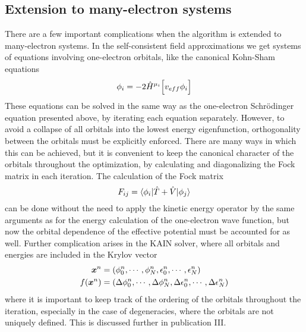 \subsection{Extension to many-electron systems}
There are a few important complications when the algorithm is extended to many-electron systems.
In the self-consistent field approximations we get systems of equations involving one-electron 
orbitals, like the canonical Kohn-Sham equations
\begin{equation}
    \phi_i = -2 \hat{H}^{\mu_i}\Big[v_{eff}\phi_i\Big]
\end{equation}
These equations can be solved in the same way as the one-electron Schr\"{o}dinger equation presented 
above, by iterating each equation separately. However, to avoid a collapse of all orbitals into the
lowest energy eigenfunction, orthogonality between the orbitals must be explicitly 
enforced\cite{Harrison_basic:2004}. There 
are many ways in which this can be achieved, but it is convenient to keep the canonical character of 
the orbitals throughout the optimization, by calculating and diagonalizing the Fock matrix in each 
iteration. The calculation of the Fock matrix 
\begin{equation}
    F_{ij} = \langle\phi_i|\hat{T}+\hat{V}|\phi_j\rangle
\end{equation}
can be done without the need to apply the kinetic energy operator by the same arguments as for 
the energy calculation of the one-electron wave function, but now the orbital dependence of the 
effective potential must be accounted for as well. Further complication arises in the KAIN solver, 
where all orbitals and energies are included in the Krylov vector
\begin{align}
    \boldsymbol x^n &= \left(\phi_0^n,\cdots,\phi_N^n,\epsilon_0^n,\cdots,\epsilon_N^n\right)\\
    f(\boldsymbol x^n) &= \left(\Delta\phi_0^n,\cdots,\Delta\phi_N^n,
	\Delta\epsilon_0^n,\cdots,\Delta\epsilon_N^n\right)
\end{align}
where it is important to keep track of the ordering of the orbitals throughout the iteration, 
especially in the case of degeneracies, where the orbitals are not uniquely defined. This is 
discussed further in publication III.

